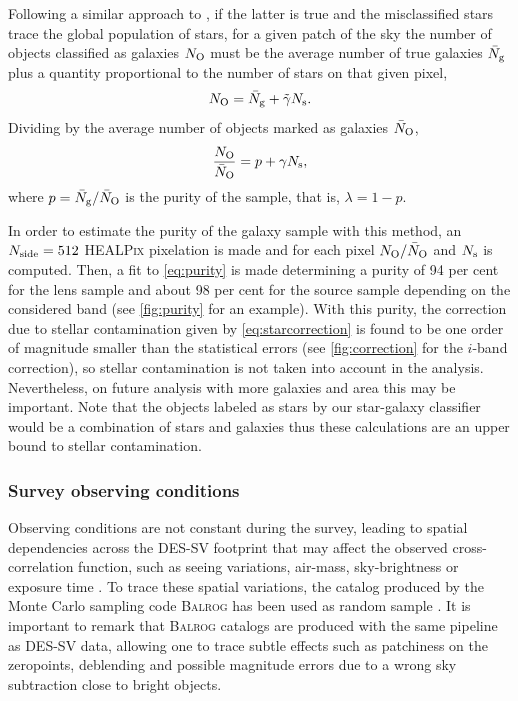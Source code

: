 	Following a similar approach to \cite{2012MNRAS.424..564R}, if the latter is true and the misclassified stars trace the global population of stars, for a given patch of the sky the number of objects classified as galaxies $N_{\rm O}$ must be the average number of true galaxies $\bar N_{\rm g}$ plus a quantity proportional to the number of stars on that given pixel,
	\begin{equation}
	N_{\rm O} = \bar N_{\rm g}+\tilde\gamma N_{\rm s}.
	\end{equation}
	Dividing by the average number of objects marked as galaxies $\bar N_{\rm O}$,
	\begin{equation}
	\frac{N_{\rm O}}{\bar N_{\rm O}} = p+\gamma N_{\rm s},
	\label{eq:purity}
	\end{equation}
	where $p=\bar N_{\rm g}/\bar N_{\rm O}$ is the purity of the sample, that is, $\lambda = 1-p$.
	\newline
	
	In order to estimate the purity of the galaxy sample with this method, an $N_{\rm side}=512$ {\scshape HEALPix} pixelation is made and for each pixel $N_{\rm O}/\bar N_{\rm O}$ and $N_{\rm s}$ is computed. Then, a fit to \autoref{eq:purity} is made determining a purity of 94 per cent for the lens sample and about 98 per cent for the source sample depending on the considered band (see \autoref{fig:purity} for an example). With this purity, the correction due to stellar contamination given by \autoref{eq:starcorrection} is found to be one order of magnitude smaller than the statistical errors (see \autoref{fig:correction} for the $i$-band correction), so stellar contamination is not taken into account in the analysis. Nevertheless, on future analysis with more galaxies and area this may be important. Note that the objects labeled as stars by our star-galaxy classifier would be a combination of stars and galaxies thus these calculations are an upper bound to stellar contamination.

	\subsubsection{Survey observing conditions}
    \label{sec:balrog}
    Observing conditions are not constant during the survey, leading to spatial dependencies across the DES-SV footprint \cite{2015arXiv150705647L} that may affect the observed cross-correlation function, such as seeing variations, air-mass, sky-brightness or exposure time \cite{2015MNRAS.454.3121M}. To trace these spatial variations, the catalog produced by the Monte Carlo sampling code {\scshape Balrog} has been used as random sample \cite{2016MNRAS.457..786S}. It is important to remark that {\scshape Balrog} catalogs are produced with the same pipeline as DES-SV data, allowing one to trace subtle effects such as patchiness on the zeropoints, deblending and possible magnitude errors due to a wrong sky subtraction close to bright objects.
    \newline
    
